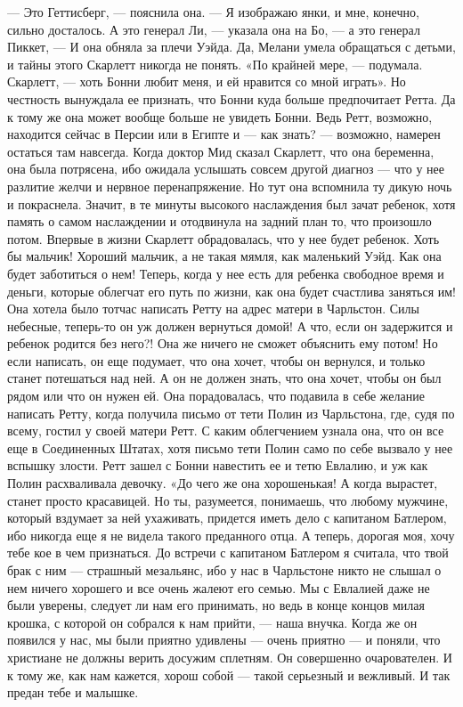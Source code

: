 — Это Геттисберг, — пояснила она. — Я изображаю янки, и мне, конечно, сильно досталось. А это генерал Ли, — указала она на Бо, — а это генерал Пиккет, — И она обняла за плечи Уэйда.
Да, Мелани умела обращаться с детьми, и тайны этого Скарлетт никогда не понять.
«По крайней мере, — подумала. Скарлетт, — хоть Бонни любит меня, и ей нравится со мной играть». Но честность вынуждала ее признать, что Бонни куда больше предпочитает Ретта. Да к тому же она может вообще больше не увидеть Бонни. Ведь Ретт, возможно, находится сейчас в Персии или в Египте и — как знать? — возможно, намерен остаться там навсегда.
Когда доктор Мид сказал Скарлетт, что она беременна, она была потрясена, ибо ожидала услышать совсем другой диагноз — что у нее разлитие желчи и нервное перенапряжение. Но тут она вспомнила ту дикую ночь и покраснела. Значит, в те минуты высокого наслаждения был зачат ребенок, хотя память о самом наслаждении и отодвинула на задний план то, что произошло потом. Впервые в жизни Скарлетт обрадовалась, что у нее будет ребенок. Хоть бы мальчик! Хороший мальчик, а не такая мямля, как маленький Уэйд. Как она будет заботиться о нем! Теперь, когда у нее есть для ребенка свободное время и деньги, которые облегчат его путь по жизни, как она будет счастлива заняться им! Она хотела было тотчас написать Ретту на адрес матери в Чарльстон. Силы небесные, теперь-то он уж должен вернуться домой! А что, если он задержится и ребенок родится без него?! Она же ничего не сможет объяснить ему потом! Но если написать, он еще подумает, что она хочет, чтобы он вернулся, и только станет потешаться над ней. А он не должен знать, что она хочет, чтобы он был рядом или что он нужен ей.
Она порадовалась, что подавила в себе желание написать Ретту, когда получила письмо от тети Полин из Чарльстона, где, судя по всему, гостил у своей матери Ретт. С каким облегчением узнала она, что он все еще в Соединенных Штатах, хотя письмо тети Полин само по себе вызвало у нее вспышку злости. Ретт зашел с Бонни навестить ее и тетю Евлалию, и уж как Полин расхваливала девочку.
«До чего же она хорошенькая! А когда вырастет, станет просто красавицей. Но ты, разумеется, понимаешь, что любому мужчине, который вздумает за ней ухаживать, придется иметь дело с капитаном Батлером, ибо никогда еще я не видела такого преданного отца. А теперь, дорогая моя, хочу тебе кое в чем признаться. До встречи с капитаном Батлером я считала, что твой брак с ним — страшный мезальянс, ибо у нас в Чарльстоне никто не слышал о нем ничего хорошего и все очень жалеют его семью. Мы с Евлалией даже не были уверены, следует ли нам его принимать, но ведь в конце концов милая крошка, с которой он собрался к нам прийти, — наша внучка. Когда же он появился у нас, мы были приятно удивлены — очень приятно — и поняли, что христиане не должны верить досужим сплетням. Он совершенно очарователен. И к тому же, как нам кажется, хорош собой — такой серьезный и вежливый. И так предан тебе и малышке.
